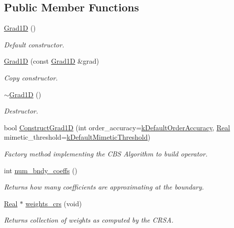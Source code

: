 \subsection*{Public Member Functions}
\begin{DoxyCompactItemize}
\item 
\hyperlink{classmtk_1_1Grad1D_ae21e6ac2652e653c48f15b304ee83a75}{Grad1\-D} ()
\begin{DoxyCompactList}\small\item\em Default constructor. \end{DoxyCompactList}\item 
\hyperlink{classmtk_1_1Grad1D_a5708bcb61bde3f7f3a4ddede191d82a4}{Grad1\-D} (const \hyperlink{classmtk_1_1Grad1D}{Grad1\-D} \&grad)
\begin{DoxyCompactList}\small\item\em Copy constructor. \end{DoxyCompactList}\item 
\hyperlink{classmtk_1_1Grad1D_a2f9b1d306c0f09f36145bb1e7e486b54}{$\sim$\-Grad1\-D} ()
\begin{DoxyCompactList}\small\item\em Destructor. \end{DoxyCompactList}\item 
bool \hyperlink{classmtk_1_1Grad1D_a74ef5245cfae6fd158bd7f563a0c2e52}{Construct\-Grad1\-D} (int order\-\_\-accuracy=\hyperlink{group__c01-roots_ga0d95560098eb36420511103637b6952f}{k\-Default\-Order\-Accuracy}, \hyperlink{group__c01-roots_gac080bbbf5cbb5502c9f00405f894857d}{Real} mimetic\-\_\-threshold=\hyperlink{group__c01-roots_ga35718d949bdc81a08a9cc8ebbe3478a2}{k\-Default\-Mimetic\-Threshold})
\begin{DoxyCompactList}\small\item\em Factory method implementing the C\-B\-S Algorithm to build operator. \end{DoxyCompactList}\item 
int \hyperlink{classmtk_1_1Grad1D_aa1448d7b389d451e03836d2ed0f197f3}{num\-\_\-bndy\-\_\-coeffs} ()
\begin{DoxyCompactList}\small\item\em Returns how many coefficients are approximating at the boundary. \end{DoxyCompactList}\item 
\hyperlink{group__c01-roots_gac080bbbf5cbb5502c9f00405f894857d}{Real} $\ast$ \hyperlink{classmtk_1_1Grad1D_a50ea44bda43d32b8741e050af52b961d}{weights\-\_\-crs} (void)
\begin{DoxyCompactList}\small\item\em Returns collection of weights as computed by the C\-R\-S\-A. \end{DoxyCompactList}\item 

\end{DoxyCompactItemize}
